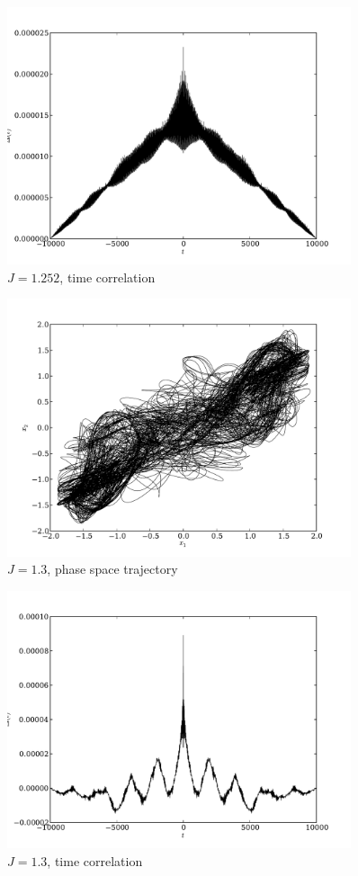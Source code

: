 \documentclass{article} %
\begin{document}
\begin{figure}[p]
	\centering
	\includegraphics[width=0.9\textwidth]{paul_figs/tcorr_J_1_252}
	\caption{$J=1.252$, time correlation}
\end{figure}
\begin{figure}[p]
	\centering
	\includegraphics[width=0.9\textwidth]{paul_figs/J_1_3}
	\caption{$J=1.3$, phase space trajectory}
\end{figure}
\begin{figure}[p]
	\centering
	\includegraphics[width=0.9\textwidth]{paul_figs/tcorr_J_1_3}
	\caption{$J=1.3$, time correlation}
\end{figure}
\end{document}
